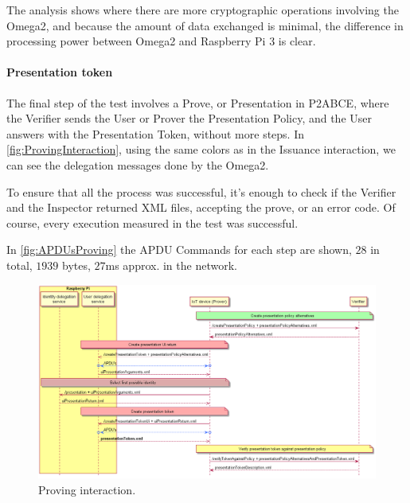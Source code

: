 The analysis shows where there are more cryptographic operations involving the Omega2, and because the amount of data exchanged is minimal, the difference in processing power between Omega2 and Raspberry Pi 3 is clear.



\paragraph{Presentation token}
The final step of the test involves a Prove, or Presentation in P2ABCE, where the Verifier sends the User or Prover the Presentation Policy, and the User answers with the Presentation Token, without more steps. In \autoref{fig:ProvingInteraction}, using the same colors as in the Issuance interaction, we can see the delegation messages done by the Omega2.

To ensure that all the process was successful, it's enough to check if the Verifier and the Inspector returned XML files, accepting the prove, or an error code. Of course, every execution measured in the test was successful.

In \autoref{fig:APDUsProving} the APDU Commands for each step are shown, $28$ in total, $1939$ bytes, $27$ms approx. in the network. 



\begin{figure}[bth]
	\begin{center}
		\includegraphics[width=\linewidth]{gfx/ProvingInteraction}
	\end{center}
	\caption{Proving interaction.}
	\label{fig:ProvingInteraction}
\end{figure}

